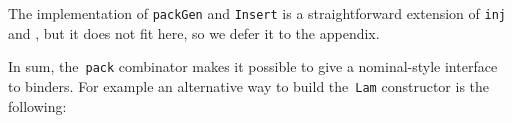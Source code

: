 \documentclass[9pt,preprint,authoryear]{sigplanconf}
\begin{document}
%
The implementation of \textcolor[rgb]{0,0,0.80}{\texttt{packGen}} and \textcolor[rgb]{0,0,0.80}{\texttt{Insert}} is a straightforward extension of \textcolor[rgb]{0,0,0.80}{\texttt{inj}} and \textcolor[cmyk]{0,0.65,0.99,0}{\texttt{\makebox[1.22ex][l]{$ {(} $}}}\textcolor[rgb]{0,0,0.80}{\texttt{\makebox[1.22ex][c]{$ \in $}}}\textcolor[cmyk]{0,0.65,0.99,0}{\texttt{\makebox[1.22ex][r]{$ {)} $}}},
     but it does not fit here, so we defer it to the appendix.%


%
In sum, the{~}\textcolor[rgb]{0,0,0.80}{\texttt{pack}} combinator makes it possible to give a nominal-style
    interface to binders. For example an alternative way to build
    the{~}\textcolor[rgb]{0.70,0.13,0.13}{\texttt{Lam}} constructor is the following{:}%


{\nopagebreak }
\end{document}
